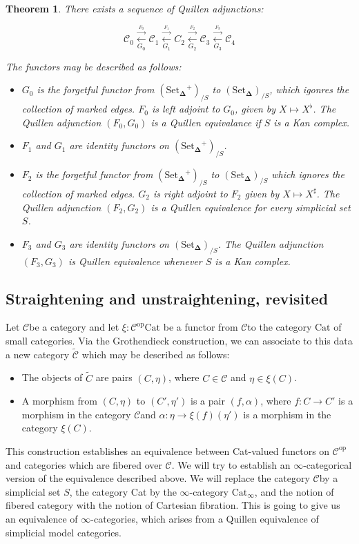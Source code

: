 \documentclass[12pt]{amsart}
\newcommand{\8}{\ensuremath{\infty}}
\newcommand{\C}{\ensuremath{\mathscr{C}}}
\newcommand{\SSet}{\ensuremath{\text{Set}_{\boldsymbol{\Delta}}}}
\newcommand{\op}[1]{\ensuremath{{#1}^{\text{op}}}}
\newcommand{\adj}[2]{\ensuremath{\overset{\overset{#1}{ \rightarrow}}{\underset{#2}{\leftarrow}}}}
\newtheorem{theorem}{Theorem}
\begin{document}
\begin{theorem}
  There exists a sequence of Quillen adjunctions:

  $$
    \C_0 \adj{F_0}{G_0} \C_1 \adj{F_1}{G_1} C_2 \adj{F_2}{G_2} \C_3 \adj{F_3}{G_3} \C_4
  $$

  The functors may be described as follows:
  \begin{itemize}
    \item[(A0)] $G_0$ is the forgetful functor from $(\SSet^+)_{/S}$ to $(\SSet)_{/S}$, which igonres the collection of marked edges. $F_0$ is left adjoint to $G_0$, given by $X \mapsto X^\flat$. The Quillen adjunction $(F_0, G_0)$ is a Quillen equivalance if $S$ is a Kan complex.
    \item[(A1)] $F_1$ and $G_1$ are identity functors on $(\SSet^+)_{/S}$.
    \item[(A2)]  $F_2$ is the forgetful functor from $(\SSet^+)_{/S}$ to $(\SSet)_{/S}$ which ignores the collection of marked edges. $G_2$ is right adjoint to $F_2$ given by $X \mapsto X^\sharp$. The Quillen adjunction $(F_2, G_2)$ is a Quillen equivalence for every simplicial set $S$.
    \item[(A3)]  $F_3$ and $G_3$ are identity functors on $(\SSet)_{/S}$. The Quillen adjunction $(F_3, G_3)$ is Quillen equivalence whenever $S$ is a Kan complex.
  \end{itemize}
\end{theorem}

\subsection{Straightening and unstraightening, revisited}
Let \C be a category and let $\xi: \op\C\text{Cat}$ be a functor from \C to the category $\text{Cat}$ of small categories. Via the Grothendieck construction, we can associate to this data a new category $\tilde{\C}$ which may be described as follows:

\begin{itemize}
  \item The objects of $\tilde{C}$ are pairs $(C, \eta)$, where $C \in \C$ and $\eta \in \xi(C)$.
  \item A morphism from $(C, \eta)$ to $(C', \eta')$ is a pair $(f, \alpha)$, where $f: C \rightarrow C'$ is a morphism in the category \C and $\alpha: \eta \rightarrow \xi(f)(\eta')$ is a morphism in the category $\xi(C)$.
\end{itemize}

This construction establishes an equivalence between Cat-valued functors on $\op\C$ and categories which are fibered over $\C$. We will try to establish an \8-categorical version of the equivalence described above. We will replace the category \C by a simplicial set $S$, the category Cat by the \8-category $\text{Cat}_{\8}$, and the notion of fibered category with the notion of Cartesian fibration. This is going to give us an equivalence of \8-categories, which arises from a Quillen equivalence of simplicial model categories.
\end{document}
